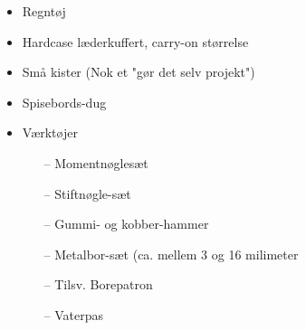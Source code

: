 
\begin{itemize}
\subsection{Praktiske Ting}
    \item Regntøj
    \item Hardcase læderkuffert, carry-on størrelse
    \item Små kister (Nok et "gør det selv projekt")
    \item Spisebords-dug
    \item Værktøjer
         \begin{itemize}
            \item[--]   Momentnøglesæt
            \item[--]   Stiftnøgle-sæt
            \item[--]   Gummi- og kobber-hammer
            \item[--]   Metalbor-sæt (ca. mellem 3 og 16 milimeter
            \item[--]   Tilsv. Borepatron
            \item[--]   Vaterpas
        \end{itemize}
\end{itemize}